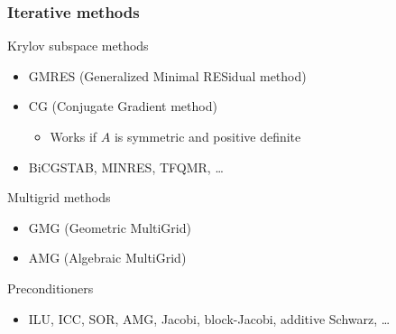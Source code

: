 \begin{frame}
  \frametitle{Iterative methods}

  Krylov subspace methods
  \begin{itemize}
  \item
    GMRES (Generalized Minimal RESidual method)
  \item
    CG (Conjugate Gradient method)
    \begin{itemize}
    \item
      Works if $A$ is symmetric and positive definite
    \end{itemize}
  \item
    BiCGSTAB, MINRES, TFQMR, \ldots
  \end{itemize}

  Multigrid methods
  \begin{itemize}
  \item
    GMG (Geometric MultiGrid)
  \item
    AMG (Algebraic MultiGrid)
  \end{itemize}

  Preconditioners
  \begin{itemize}
  \item
    ILU, ICC, SOR, AMG, Jacobi, block-Jacobi, additive Schwarz, \ldots
  \end{itemize}

\end{frame}
